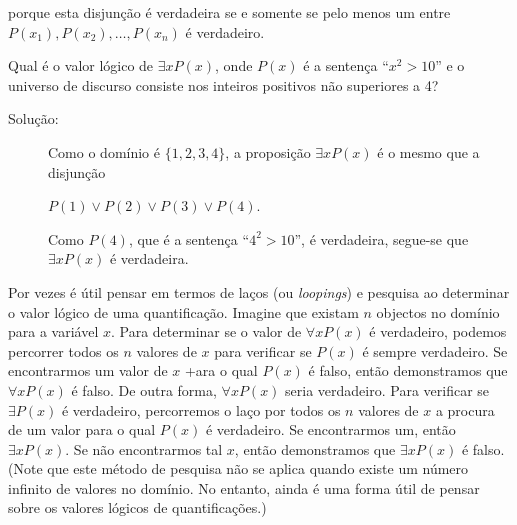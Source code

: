 porque esta disjunção é verdadeira se e somente se pelo menos um entre $P(x_1),
P(x_2), \ldots, P(x_n)$ é verdadeiro.

\begin{exmp}
\label{exem140}
Qual é o valor lógico de $\exists xP(x)$, onde $P(x)$ é a sentença ``$x^2 >
10$'' e o universo de discurso consiste nos inteiros positivos não superiores a 4?
\begin{description}
\item[Solução:]Como o domínio é $\{1,2,3,4\}$, a proposição $\exists xP(x)$ é o
mesmo que a disjunção

\begin{center}
$P(1) \lor P(2) \lor P(3) \lor P(4)$.
\end{center}

Como $P(4)$, que é a sentença ``$4^2 > 10$'', é verdadeira, segue-se que
$\exists xP(x)$ é verdadeira.
\end{description}
\end{exmp}

Por vezes é útil pensar em termos de laços (ou \emph{loopings}) e pesquisa ao
determinar o valor lógico de uma quantificação. Imagine que existam $n$
objectos no domínio para a variável $x$. Para determinar se o valor de $\forall
xP(x)$ é verdadeiro, podemos percorrer todos os $n$ valores de $x$ para
verificar se $P(x)$ é sempre verdadeiro. Se encontrarmos um valor de $x$ +ara o
qual $P(x)$ é falso, então demonstramos que $\forall xP(x)$ é falso. De outra
forma, $\forall xP(x)$ seria verdadeiro. Para verificar se $\exists P(x)$ é
verdadeiro, percorremos o laço por todos os $n$ valores de $x$ a procura de um
valor para o qual $P(x)$ é verdadeiro. Se encontrarmos um, então $\exists
xP(x)$. Se não encontrarmos tal $x$, então demonstramos que $\exists xP(x)$ é
falso. (Note que este método de pesquisa não se aplica quando existe um número
infinito de valores no domínio. No entanto, ainda é uma forma útil de pensar
sobre os valores lógicos de quantificações.)

